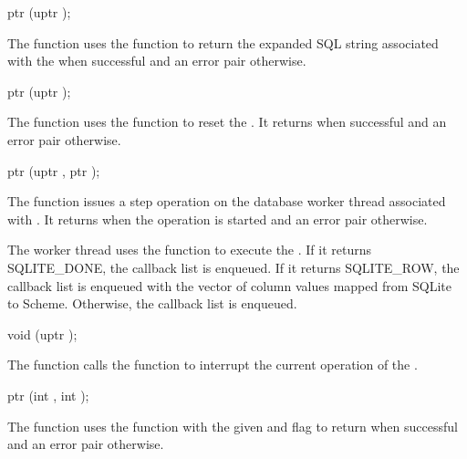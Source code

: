 \begin{function}
  ptr (uptr );
\end{function}

The  function uses the
 function to return the expanded SQL
string associated with the  when successful and an
error pair otherwise.

\begin{function}
  ptr (uptr );
\end{function}

The  function uses the
 function to reset the . It
returns  when successful and an error pair otherwise.

\begin{function}
  ptr (uptr , ptr );
\end{function}

The  function issues a step operation on
the database worker thread associated with . It returns
 when the operation is started and an error pair otherwise.

The worker thread uses the  function to execute
the . If it returns SQLITE\_DONE, the callback list
 is enqueued. If it returns SQLITE\_ROW,
the callback list  is
enqueued with the vector of column values mapped from SQLite to
Scheme. Otherwise, the callback list  is enqueued.

\begin{function}
  void (uptr );
\end{function}

The  function calls the
 function to interrupt the current operation
of the .

\begin{function}
  ptr (int , int );
\end{function}

The  function uses the
 function with the given  and
 flag to return 
when successful and an error pair otherwise.
